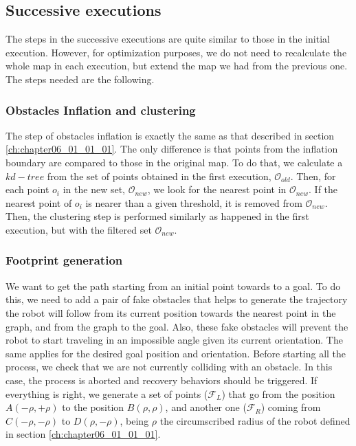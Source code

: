 \subsection{Successive executions}\label{ch:chapter06_01_02}

The steps in the successive executions are quite similar to those in the initial execution. However, for optimization purposes, we do not need to recalculate the whole map in each execution, but extend the map we had from the previous one. The steps needed are the following.

\subsubsection{Obstacles Inflation and clustering}\label{ch:chapter06_01_02_01}

The step of obstacles inflation is exactly the same as that described in section \ref{ch:chapter06_01_01_01}. The only difference is that points from the inflation boundary are compared to those in the original map. To do that, we calculate a $kd-tree$ from the set of points obtained in the first execution, $\mathcal{O}_{old}$. Then, for each point $o_i$ in the new set, $\mathcal{O}_{new}$, we look for the nearest point in $\mathcal{O}_{new}$. If the nearest point of $o_i$ is nearer than a given threshold, it is removed from $\mathcal{O}_{new}$. Then, the clustering step is performed similarly as happened in the first execution, but with the filtered set $\mathcal{O}_{new}$.

\subsubsection{Footprint generation}\label{ch:chapter06_01_02_02}

We want to get the path starting from an initial point towards to a goal. To do this, we need to add a pair of fake obstacles that helps to generate the trajectory the robot will follow from its current position towards the nearest point in the graph, and from the graph to the goal. Also, these fake obstacles will prevent the robot to start traveling in an impossible angle given its current orientation. The same applies for the desired goal position and orientation. Before starting all the process, we check that we are not currently colliding with an obstacle. In this case, the process is aborted and recovery behaviors should be triggered. If everything is right, we generate a set of points ($\mathcal{F}_L$) that go from the position $A(-\rho, +\rho)$ to the position $B(\rho, \rho)$, and another one ($\mathcal{F}_R$) coming from $C(-\rho, -\rho)$ to $D(\rho, -\rho)$, being $\rho$ the circumscribed radius of the robot defined in section \ref{ch:chapter06_01_01_01}. 

